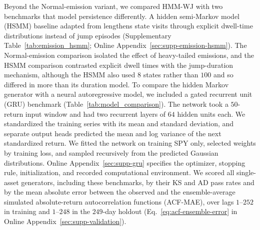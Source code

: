 Beyond the Normal-emission variant, we compared HMM-WJ with two
benchmarks that model persistence differently. A hidden semi-Markov
model (HSMM) baseline adapted from \citet{bullaBulla2006} lengthens state visits through explicit
dwell-time distributions instead of jump episodes
(Supplementary Table~\ref{tab:emission_hsmm}; Online
Appendix~\ref{sec:supp-emission-hsmm}). The Normal-emission comparison
isolated the effect of heavy-tailed emissions, and the HSMM
comparison contrasted explicit dwell times with the jump-duration
mechanism, although the HSMM also used $8$ states rather than $100$ and so
differed in more than its duration model. To compare the hidden Markov
generator with a neural autoregressive model, we
included a gated recurrent unit (GRU) benchmark
(Table~\ref{tab:model_comparison}). The network took a $50$-return input window and had two recurrent
layers of $64$ hidden units each. We standardized the training series with its mean and standard
deviation, and separate output heads predicted the mean and log
variance of the next standardized return. We fitted the network on training SPY only,
selected weights by training loss, and sampled recursively from
the predicted Gaussian distributions. Online
Appendix~\ref{sec:supp-gru} specifies the optimizer, stopping rule,
initialization, and recorded computational environment. We scored all single-asset generators,
including these benchmarks, by their KS and AD pass rates and by the mean absolute error between the observed and the
ensemble-average simulated absolute-return autocorrelation functions
(ACF-MAE), over lags $1$--$252$ in training and $1$--$248$ in the
$249$-day holdout (Eq.~\eqref{eq:acf-ensemble-error} in Online
Appendix~\ref{sec:supp-validation}).
